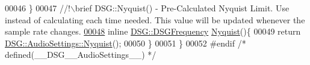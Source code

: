 \begin{DoxyCode}
00046     \}\textcolor{comment}{}
00047 \textcolor{comment}{    //!\(\backslash\)brief DSG::Nyquist() - Pre-Calculated Nyquist Limit. Use instead of calculating each time needed.
       This value will be updated whenever the sample rate changes.}
\hypertarget{_audio_settings_8h_source_l00048}{}\hyperlink{namespace_d_s_g_acb23c320b74d21f203081a25e1b5d134}{00048} \textcolor{comment}{}    \textcolor{keyword}{inline} \hyperlink{namespace_d_s_g_a4315a061386fa1014fda09b15d3a6973}{DSG::DSGFrequency} \hyperlink{namespace_d_s_g_acb23c320b74d21f203081a25e1b5d134}{Nyquist}()\{
00049         \textcolor{keywordflow}{return} \hyperlink{class_d_s_g_1_1_audio_settings_a8cb4afd7b58e927300ff46fbeb71bec7}{DSG::AudioSettings::Nyquist}();
00050     \}
00051 \}
00052 \textcolor{preprocessor}{#endif }\textcolor{comment}{/* defined(\_\_DSG\_\_AudioSettings\_\_) */}\textcolor{preprocessor}{}
\end{DoxyCode}

